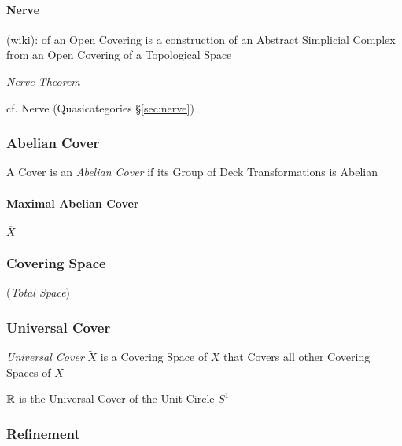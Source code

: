 \paragraph{Nerve}\label{sec:covering_nerve}\hfill

(wiki): of an Open Covering is a construction of an Abstract Simplicial Complex
from an Open Covering of a Topological Space

\emph{Nerve Theorem}

cf. Nerve (Quasicategories \S\ref{sec:nerve})



\subsubsection{Abelian Cover}\label{sec:abelian_cover}

A Cover is an \emph{Abelian Cover} if its Group of Deck
Transformations is Abelian



\paragraph{Maximal Abelian Cover}\label{sec:maximal_abelian_cover}\hfill

$\overline{X}$


\subsubsection{Covering Space}\label{sec:covering_space}

(\emph{Total Space})



\subsubsection{Universal Cover}\label{sec:universal_cover}\hfill

\emph{Universal Cover} $\tilde{X}$ is a Covering Space of $X$ that
Covers all other Covering Spaces of $X$

$\mathbb{R}$ is the Universal Cover of the Unit Circle $S^1$




\subsubsection{Refinement}\label{sec:refinement}



